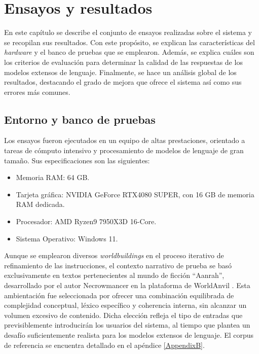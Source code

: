 
\chapter{Ensayos y resultados} %

\label{Chapter4} %
En este capítulo se describe el conjunto de ensayos realizadas sobre el sistema y se recopilan sus resultados.
Con este propósito, se explican las características del \textit{hardware} y el banco de pruebas que se emplearon.
Además, se explica cuáles son los criterios de evaluación para determinar la calidad de las respuestas de los
modelos extensos de lenguaje.
Finalmente, se hace un análisis global de los resultados, destacando el grado de mejora que ofrece el sistema así como
sus errores más comunes.


\section{Entorno y banco de pruebas}
Los ensayos fueron ejecutados en un equipo de altas prestaciones, orientado a tareas de cómputo intensivo y procesamiento de modelos de lenguaje de gran tamaño.
Sus especificaciones son las siguientes:
\begin{itemize}
\item Memoria RAM: 64 GB.
\item Tarjeta gráfica: NVIDIA GeForce RTX4080 SUPER, con 16 GB de memoria RAM dedicada.
\item Procesador: AMD Ryzen9 7950X3D 16-Core.
\item Sistema Operativo: Windows 11.
\end{itemize}

Aunque se emplearon diversos \textit{worldbuildings} en el proceso iterativo de refinamiento de las instrucciones,
el contexto narrativo de prueba se basó exclusivamente en textos pertenecientes al mundo de ficción ``Aanrah'',
desarrollado por el autor Necrowmancer en la plataforma de WorldAnvil \cite{aanrah2024}.
Esta ambientación fue seleccionada por ofrecer una combinación equilibrada de complejidad conceptual,
léxico específico y coherencia interna, sin alcanzar un volumen excesivo de contenido.
Dicha elección refleja el tipo de entradas que previsiblemente introducirán los usuarios del sistema,
al tiempo que plantea un desafío suficientemente realista para los modelos extensos de lenguaje.
El corpus de referencia se encuentra detallado en el apéndice \ref{AppendixB}.

